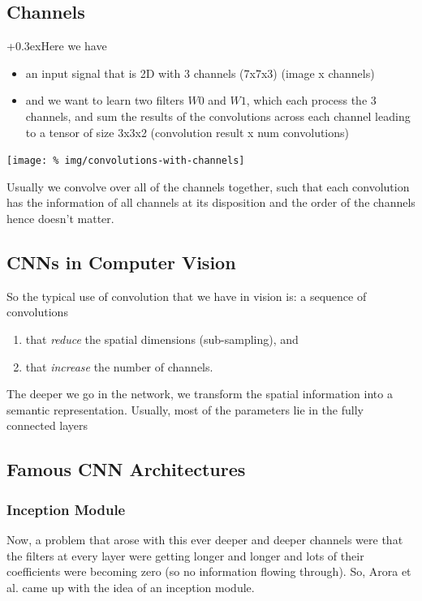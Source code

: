 \documentclass[a2paper,8pt]{extarticle}
\newcommand{\customboxpaddingsize}{0pt}
\newcommand{\emptyarg}[1][]{\ifthenelse{\isempty{#1}}{}{\ (#1)}}
\newcommand{\Ex}[1][]{{\setlength\fboxsep{\customboxpaddingsize}
\colorbox{excolor}{%
\color{custtitlecolor}{\textbf{Ex.\emptyarg[#1]}}}\kern+0.3ex}}
\begin{document}
\begin{landscape}
\begin{multicols*}{7}
\subsection{Channels}

\Ex Here we have
\begin{itemize}
  \item an input signal that is 2D with 3 channels (7x7x3) (image x channels)
  \item and we want to learn two filters $W0$ and $W1$, which each process the 3
  channels, and sum the results of the convolutions across each channel leading
  to a tensor of size 3x3x2 (convolution result x num convolutions)
\end{itemize}

\begin{center}
  \texttt{[image: \%
img/convolutions-with-channels]}
\end{center}

Usually we convolve over all of the channels together, such that each
convolution has the information of all channels at its disposition and the
order of the channels hence doesn't matter.

\subsection{CNNs in Computer Vision}

So the typical use of convolution that we have in vision is: a sequence of
convolutions
\begin{enumerate}
  \item that \emph{reduce} the spatial dimensions (sub-sampling), and
  \item that \emph{increase} the number of channels.
\end{enumerate}
The deeper we go in the network, we transform the spatial information into a
semantic representation. Usually, most of the parameters lie in the fully
connected layers

\subsection{Famous CNN Architectures}


\subsubsection{Inception Module}

Now, a problem that arose with this ever deeper and deeper channels were that
the filters at every layer were getting longer and longer and lots of their
coefficients were becoming zero (so no information flowing through). So, Arora
et al. came up with the idea of an inception module.


\end{multicols*}
\end{landscape}
\end{document}
